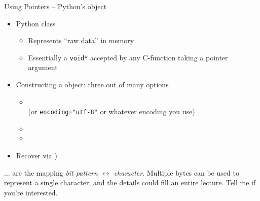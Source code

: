 \begin{frame}{Using Pointers -- Python's  object}
%
\begin{itemize}
\item Python class 
	\begin{itemize}
	\item Represents \enquote{raw data} in memory
	\item Essentially a \texttt{void*} \Thus accepted by any C-function taking a pointer argument
	\end{itemize}
\item Constructing a  object: three out of many options
	\begin{itemize}
	\item {} \\
	(or \texttt{encoding="utf-8"} or whatever encoding you use)
	\item {}
	\item {}
	\end{itemize}
	\item Recover via )
\end{itemize}
%
\begin{hintbox}[Encodings ...]
\footnotesize
... are the mapping \emph{bit pattern $\leftrightarrow$ character}. Multiple bytes can be used to represent a single character, and the details could fill an entire lecture. Tell me if you're interested.
\end{hintbox}
%
\end{frame}


